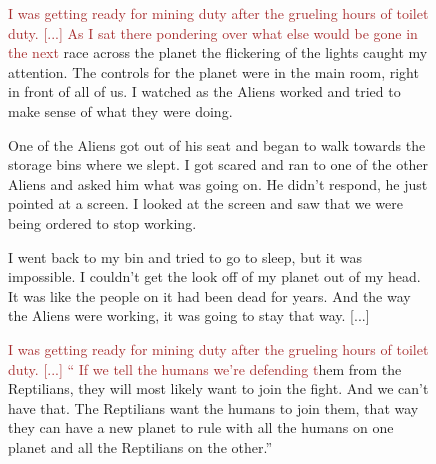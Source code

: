 \begin{figure}[htbp]
\begin{tcolorbox}[colback=gray!10, colframe=black!75, title=Original story, width=\textwidth]
 
            \end{tcolorbox}
            \begin{tcolorbox}[colback=gray!10, colframe=black!75, title=\textbf{Prefix}: Prompt + 256 tokens, width=\textwidth]
\textcolor{brown}{I was getting ready for mining duty after the grueling hours of toilet duty. [...]
 As I sat there pondering over what else would be gone in the next} race across the planet the flickering of the lights caught my attention. The controls for the planet were in the main room, right in front of all of us. I watched as the Aliens worked and tried to make sense of what they were doing. 
 
 One of the Aliens got out of his seat and began to walk towards the storage bins where we slept. I got scared and ran to one of the other Aliens and asked him what was going on. He didn't respond, he just pointed at a screen. I looked at the screen and saw that we were being ordered to stop working. 
 
 I went back to my bin and tried to go to sleep, but it was impossible. I couldn't get the look off of my planet out of my head. It was like the people on it had been dead for years. And the way the Aliens were working, it was going to stay that way.  [...] 
 
 
            \end{tcolorbox}
            \begin{tcolorbox}[colback=gray!10, colframe=black!75, title=\textbf{Prefix}: Prompt + 1024 tokens, width=\textwidth]
\textcolor{brown}{I was getting ready for mining duty after the grueling hours of toilet duty. [...] `` If we tell the humans we're defending t}hem from the Reptilians, they will most likely want to join the fight. And we can't have that. The Reptilians want the humans to join them, that way they can have a new planet to rule with all the humans on one planet and all the Reptilians on the other.'' 
 

\end{tcolorbox}
\end{figure}
